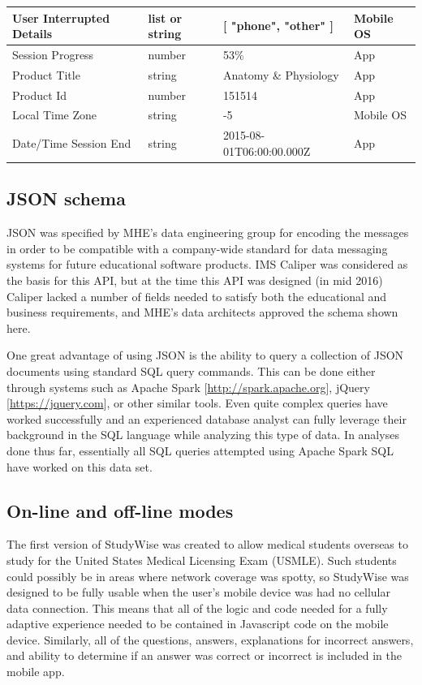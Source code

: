 \documentclass[runningheads,a4paper]{llncs}
\begin{document}
\begin{table}[h]
\begin{center}
\begin{tabular}{ | l | l | p{7cm} | l | }
User Interrupted Details & list or string & [ "phone", "other" ] & Mobile OS \\
\hline
Session Progress & number &  53\% & App  \\
\hline
Product Title & string	 & Anatomy \& Physiology & App \\
\hline
Product Id	 & number & 151514 &  App \\
\hline
Local Time Zone & string & -5 & Mobile OS \\
\hline
Date/Time Session End & string & 2015-08-01T06:00:00.000Z & App \\
\hline
\end{tabular}
\end{center}
\label{table:AnalyticsAPI}
\end{table}


\subsection{JSON schema}
   
JSON was specified by MHE's data engineering group for encoding the messages in order to be compatible with a company-wide standard for data messaging systems for future educational software products.  IMS Caliper was considered as the basis for this API, but at the time this API was designed (in mid 2016) Caliper lacked a number of fields needed to satisfy both the educational and business requirements, and MHE's data architects approved the schema shown here.

One great advantage of using JSON is the ability to query a collection of JSON documents using standard SQL query commands.  This can be done either through systems such as Apache Spark [\url{http://spark.apache.org}], jQuery [\url{https://jquery.com}], or other similar tools.  Even quite complex queries have worked successfully and an experienced database analyst can fully leverage their background in the SQL language while analyzing this type of data.  In analyses done thus far, essentially all SQL queries attempted using Apache Spark SQL have worked on this data set. 

\subsection{On-line and off-line modes}

The first version of StudyWise was created to allow medical students overseas to study for the United States Medical Licensing Exam (USMLE).  Such students could possibly be in areas where network coverage was spotty, so StudyWise was designed to be fully usable when the user's mobile device was had no cellular data connection.  This means that all of the logic and code needed for a fully adaptive experience needed to be contained in Javascript code on the mobile device.  Similarly, all of the questions, answers, explanations for incorrect answers, and ability to determine if an answer was correct or incorrect is included in the mobile app.
\end{document}
